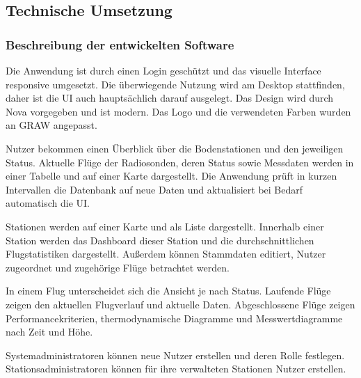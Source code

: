 \subsection{Technische Umsetzung}

\subsubsection{Beschreibung der entwickelten Software}
Die Anwendung ist durch einen Login geschützt und das visuelle Interface responsive umgesetzt.
Die überwiegende Nutzung wird am Desktop stattfinden, daher ist die UI auch hauptsächlich darauf ausgelegt.
Das Design wird durch Nova vorgegeben und ist modern.
Das Logo und die verwendeten Farben wurden an GRAW angepasst.

Nutzer bekommen einen Überblick über die Bodenstationen und den jeweiligen Status.
Aktuelle Flüge der Radiosonden, deren Status sowie Messdaten werden in einer Tabelle und auf einer Karte dargestellt.
Die Anwendung prüft in kurzen Intervallen die Datenbank auf neue Daten und aktualisiert bei Bedarf automatisch die UI.

Stationen werden auf einer Karte und als Liste dargestellt.
Innerhalb einer Station werden das Dashboard dieser Station und die durchschnittlichen Flugstatistiken dargestellt.
Außerdem können Stammdaten editiert, Nutzer zugeordnet und zugehörige Flüge betrachtet werden.

In einem Flug unterscheidet sich die Ansicht je nach Status.
Laufende Flüge zeigen den aktuellen Flugverlauf und aktuelle Daten.
Abgeschlossene Flüge zeigen Performancekriterien, thermodynamische Diagramme und Messwertdiagramme nach Zeit und Höhe.

Systemadministratoren können neue Nutzer erstellen und deren Rolle festlegen.
Stationsadministratoren können für ihre verwalteten Stationen Nutzer erstellen.

\newpage

